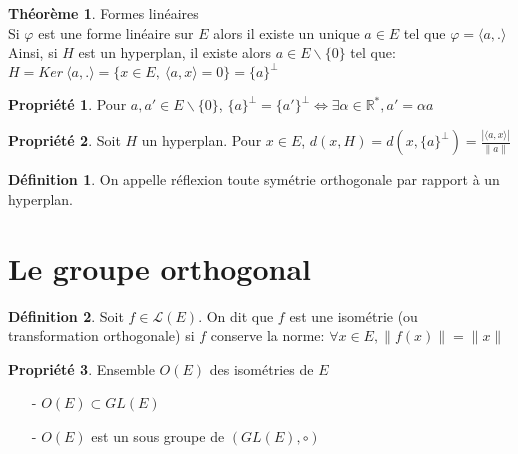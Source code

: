 \documentclass[fleqn]{article}
\theoremstyle{definition} \newtheorem*{defi}{D\'efinition}
\theoremstyle{definition} \newtheorem*{theo}{Th\'eor\`eme}
\theoremstyle{definition} \newtheorem*{coro}{Corollaire}
\theoremstyle{remark} \newtheorem*{rqs}{Remarques}
\theoremstyle{definition} \newtheorem*{prop}{Propri\'et\'e}
\begin{document}
\begin{theo} Formes lin\'eaires \\
	Si $\varphi$ est une forme lin\'eaire sur $E$ alors il existe un unique $a \in E$ tel que $\varphi = \langle a,. \rangle$ \\
	Ainsi, si $H$ est un hyperplan, il existe alors $a \in E\backslash \{0\}$ tel que: \\$H = Ker\ \langle a,. \rangle = \{x \in E ,\ \langle a,x
	\rangle = 0\} = \{a\}^\perp$
\end{theo}

\begin{prop}
	Pour $a,a' \in E\backslash \{0\}$, $\{a\}^\perp = \{a'\}^\perp \Leftrightarrow \exists \alpha \in \mathbb{R}^*, a' = \alpha a$
\end{prop}

\begin{prop}
	Soit $H$ un hyperplan. Pour $x \in E$, $d(x,H) = d(x, \{a\}^\perp) = \frac {|\langle a,x \rangle|}{\|a\|}$
\end{prop}

\begin{defi}
	On appelle r\'eflexion toute sym\'etrie orthogonale par rapport \`a un hyperplan.
\end{defi}

\section{Le groupe orthogonal}

\begin{defi}
	Soit $f \in \mathscr{L}(E)$. On dit que $f$ est une isom\'etrie (ou transformation orthogonale) si $f$ conserve la norme: $\forall x \in E,
	\|f(x)\| = \|x\|$
\end{defi}

\begin{prop} Ensemble $O(E)$ des isom\'etries de $E$
	\begin{enumerate}
		\item [-] $O(E) \subset GL(E)$
		\item [-] $O(E)$ est un sous groupe de $(GL(E),\circ)$
	\end{enumerate}
\end{prop}
\end{document}
